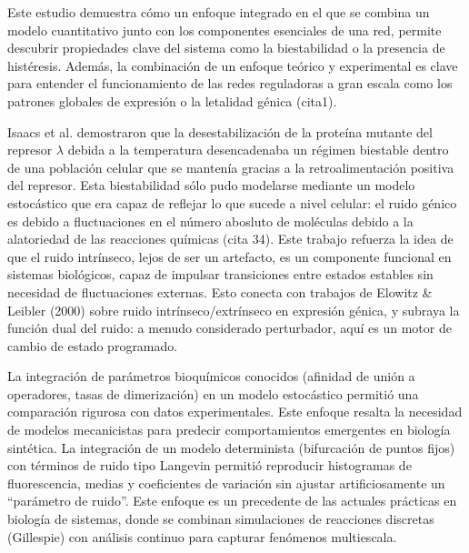 \documentclass[nochap]{config/ejercicios}
\begin{document}
Este estudio demuestra cómo un enfoque integrado en el que se combina un modelo cuantitativo junto con los componentes esenciales de una red, permite descubrir propiedades clave del sistema como la biestabilidad o la presencia de histéresis. Además, la combinación de un enfoque teórico y experimental es clave para entender el funcionamiento de las redes reguladoras a gran escala como los patrones globales de expresión o la letalidad génica (cita1).

Isaacs et al. demostraron que la desestabilización de la proteína mutante del represor $\lambda$ debida a la temperatura desencadenaba un régimen biestable dentro de una población celular que se mantenía gracias a la retroalimentación positiva del represor. Esta biestabilidad sólo pudo modelarse mediante un modelo estocástico que era capaz de reflejar lo que sucede a nivel celular: el ruido génico es debido a fluctuaciones en el número abosluto de moléculas debido a la alatoriedad de las reacciones químicas (cita 34). Este trabajo refuerza la idea de que el ruido intrínseco, lejos de ser un artefacto, es un componente funcional en sistemas biológicos, capaz de impulsar transiciones entre estados estables sin necesidad de fluctuaciones externas. Esto conecta con trabajos de Elowitz \& Leibler (2000) sobre ruido intrínseco/extrínseco en expresión génica, y subraya la función dual del ruido: a menudo considerado perturbador, aquí es un motor de cambio de estado programado.



La integración de parámetros bioquímicos conocidos (afinidad de unión a operadores, tasas de dimerización) en un modelo estocástico permitió una comparación rigurosa con datos experimentales. Este enfoque resalta la necesidad de modelos mecanicistas para predecir comportamientos emergentes en biología sintética.
La integración de un modelo determinista (bifurcación de puntos fijos) con términos de ruido tipo Langevin permitió reproducir histogramas de fluorescencia, medias y coeficientes de variación sin ajustar artificiosamente un “parámetro de ruido”. Este enfoque es un precedente de las actuales prácticas en biología de sistemas, donde se combinan simulaciones de reacciones discretas (Gillespie) con análisis continuo para capturar fenómenos multiescala.
\end{document}
